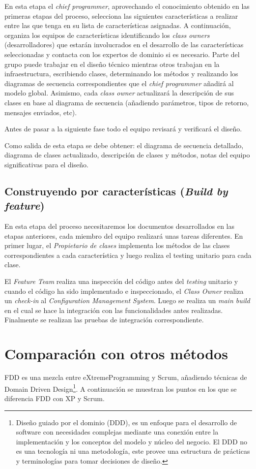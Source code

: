 \documentclass[11pt]{article}
\begin{document}
En esta etapa el \textit{chief programmer}, aprovechando el conocimiento obtenido en las primeras etapas del proceso, selecciona las siguientes características a realizar entre las que tenga en su lista de características asignadas. A continuación, organiza los equipos de características identificando los \textit{class owners} (desarrolladores) que estarán involucrados en el desarrollo de las características seleccionadas y contacta con los expertos de dominio si es necesario. Parte del grupo puede trabajar en el diseño técnico mientras otros trabajan en la infraestructura, escribiendo clases, determinando los métodos y realizando los diagramas de secuencia correspondientes que el \textit{chief programmer} añadirá al modelo global. Asimismo, cada \textit{class owner} actualizará la descripción de sus clases en base al diagrama de secuencia (añadiendo parámetros, tipos de retorno, mensajes enviados, etc).

Antes de pasar a la siguiente fase todo el equipo revisará y verificará el diseño.

Como salida de esta etapa se debe obtener: el diagrama de secuencia detallado, diagrama de clases actualizado, descripción de clases y métodos, notas del equipo significativas para el diseño.

\subsection{Construyendo por características (\textit{Build by feature})}
En esta etapa del proceso necesitaremos los documentos desarrollados en las etapas anteriores, cada miembro del equipo realizará unas tareas diferentes. En primer lugar, el \textit{Propietario de clases} implementa los métodos de las clases correspondientes a cada característica y luego realiza el testing unitario para cada clase.

El \textit{Feature Team} realiza una inspección del código antes del \textit{testing} unitario y cuando el código ha sido implementado e inspeccionado, el \textit{Class Owner} realiza un \textit{check-in} al \textit{Configuration Management System}. Luego se realiza un \textit{main build} en el cual se hace la integración con las funcionalidades antes realizadas. Finalmente se realizan las pruebas de integración correspondiente.


\section{Comparación con otros métodos}
FDD es una mezcla entre eXtremeProgramming y Scrum, añadiendo técnicas de Domain Driven Design\footnote{Diseño guiado por el dominio (DDD), es un enfoque para el desarrollo de software con necesidades complejas mediante una conexión entre la implementación y los conceptos del modelo y núcleo del negocio. El DDD no es una tecnología ni una metodología, este provee una estructura de prácticas y terminologías para tomar decisiones de diseño.}. A continuación se muestran los puntos en los que se diferencia FDD con XP y Scrum.
\end{document}
